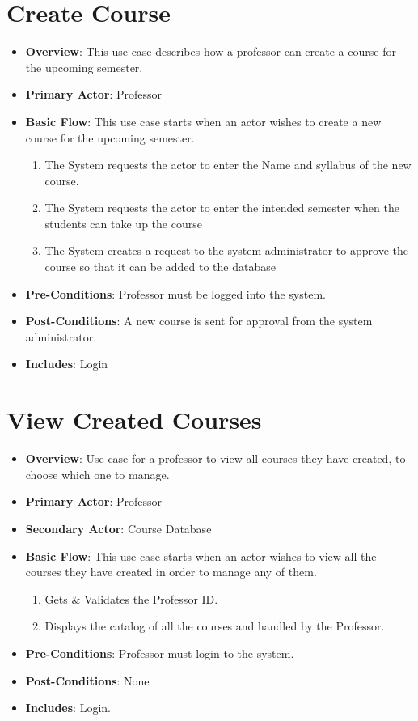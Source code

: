 \documentclass[12pt, a4]{report}
\begin{document}
\section{Create Course}
\begin{itemize}
    \item \textbf{Overview}: This use case describes how a professor can create a course for the upcoming semester.
    \item \textbf{Primary Actor}: Professor
    \item \textbf{Basic Flow}: This use case starts when an actor wishes to create a new course for the upcoming semester.
        \begin{enumerate}
            \item The System requests the actor to enter the Name and syllabus of the new course.
            \item The System requests the actor to enter the intended semester when the students can take up the course
            \item The System creates a request to the system administrator to approve the course so that it can be added to the database
        \end{enumerate}
    \item \textbf{Pre-Conditions}: Professor must be logged into the system.
    \item \textbf{Post-Conditions}: A new course is sent for approval from the system administrator.
    \item \textbf{Includes}: Login
\end{itemize}

\section{View Created Courses}
\begin{itemize}
    \item \textbf{Overview}: Use case for a professor to view all courses they have created, to choose which one to manage.
    \item \textbf{Primary Actor}: Professor
    \item \textbf{Secondary Actor}: Course Database
    \item \textbf{Basic Flow}: This use case starts when an actor wishes to view all the courses they have created in order to manage any of them.
        \begin{enumerate}
            \item Gets \& Validates the Professor ID.
            \item Displays the catalog of all the courses and handled by the Professor.
        \end{enumerate}
    \item \textbf{Pre-Conditions}: Professor must login to the system.
    \item \textbf{Post-Conditions}: None
    \item \textbf{Includes}: Login.
\end{itemize}
\end{document}
